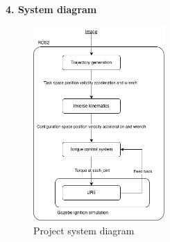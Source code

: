 \documentclass[10pt]{article}
\begin{document}
\newpage

\large
\noindent
\textbf{4. System diagram} \\
\normalsize
\indent
\begin{figure}[h]
    \centering
    \includegraphics[width=5cm,keepaspectratio]{img/system_diagram.png}
    \caption{Project system diagram}
    \label{fig:system diagram} 
\end{figure}
\vspace*{-0.5\baselineskip} 
\end{document}
